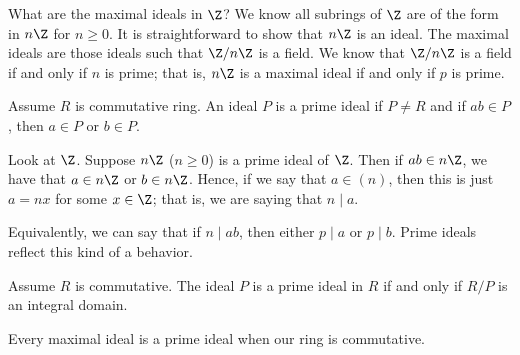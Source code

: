 \begin{eg}
    What are the maximal ideals in \( \Z  \)? We know all subrings of \( \Z  \) are of the form in \( n\Z  \) for \( n \geq 0  \). It is straightforward to show that \( n\Z  \) is an ideal. The maximal ideals are those ideals such that \( \Z / n \Z  \) is a field. We know that \( \Z / n \Z \) is a field if and only if \( n  \) is prime; that is, \( n \Z  \) is a maximal ideal if and only if \( p  \) is prime. 
\end{eg}

\begin{definition}
    Assume \( R  \) is commutative ring. An ideal \( P  \) is a prime ideal if \( P \neq R  \) and if \( ab \in  P  \), then \( a \in P  \) or \( b \in P  \).
\end{definition}

\begin{remark}
    Look at \( \Z  \). Suppose \( n\Z  \) (\( n \geq 0  \)) is a prime ideal of \( \Z  \). Then if \( ab \in n \Z  \), we have that \( a \in n \Z  \) or \( b \in n\Z  \). Hence, if we say that \( a \in (n) \), then this is just \( a = n x  \) for some \( x \in \Z  \); that is, we are saying that \( n \mid a  \).

    Equivalently, we can say that if \( n \mid ab \), then either \( p \mid a  \) or \(  p \mid b  \). Prime ideals reflect this kind of a behavior.
\end{remark}

\begin{prop}
    Assume \( R  \) is commutative. The ideal \( P  \) is a prime ideal in \( R  \) if and only if \( R / P  \) is an integral domain. 
\end{prop}

\begin{corollary}
    Every maximal ideal is a prime ideal when our ring is commutative.
\end{corollary}


